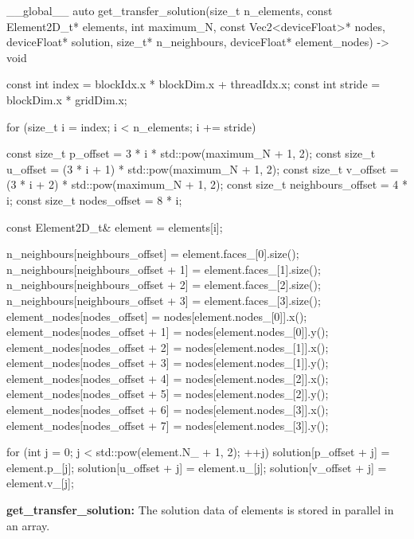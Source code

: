 \begin{algorithm}[H]
    \begin{cuda}
        __global__
        auto get_transfer_solution(size_t n_elements, const Element2D_t* elements, 
                int maximum_N, const Vec2<deviceFloat>* nodes, deviceFloat* solution, 
                size_t* n_neighbours, deviceFloat* element_nodes) -> void {

            const int index = blockIdx.x * blockDim.x + threadIdx.x;
            const int stride = blockDim.x * gridDim.x;

            for (size_t i = index; i < n_elements; i += stride) {
                const size_t p_offset =  3 * i      * std::pow(maximum_N + 1, 2);
                const size_t u_offset = (3 * i + 1) * std::pow(maximum_N + 1, 2);
                const size_t v_offset = (3 * i + 2) * std::pow(maximum_N + 1, 2);
                const size_t neighbours_offset = 4 * i;
                const size_t nodes_offset = 8 * i;

                const Element2D_t& element = elements[i];

                n_neighbours[neighbours_offset]     = element.faces_[0].size();
                n_neighbours[neighbours_offset + 1] = element.faces_[1].size();
                n_neighbours[neighbours_offset + 2] = element.faces_[2].size();
                n_neighbours[neighbours_offset + 3] = element.faces_[3].size();
                element_nodes[nodes_offset]     = nodes[element.nodes_[0]].x();
                element_nodes[nodes_offset + 1] = nodes[element.nodes_[0]].y();
                element_nodes[nodes_offset + 2] = nodes[element.nodes_[1]].x();
                element_nodes[nodes_offset + 3] = nodes[element.nodes_[1]].y();
                element_nodes[nodes_offset + 4] = nodes[element.nodes_[2]].x();
                element_nodes[nodes_offset + 5] = nodes[element.nodes_[2]].y();
                element_nodes[nodes_offset + 6] = nodes[element.nodes_[3]].x();
                element_nodes[nodes_offset + 7] = nodes[element.nodes_[3]].y();

                for (int j = 0; j < std::pow(element.N_ + 1, 2); ++j) {
                    solution[p_offset + j] = element.p_[j];
                    solution[u_offset + j] = element.u_[j];
                    solution[v_offset + j] = element.v_[j];
                }
            }
        }\end{cuda}
\caption{\textbf{get\_transfer\_solution:} The solution data of elements is stored in parallel in an array.}\label{alg:get_transfer_solution}
\end{algorithm}

